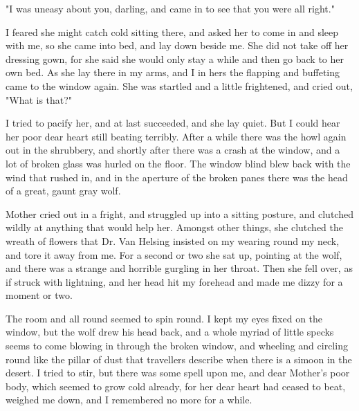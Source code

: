 "I was uneasy about you, darling, and came in to see that you were all right." 

I feared she might catch cold sitting there, and asked her to come in and sleep with me, so she came into bed, and lay down beside me. She did not take off her dressing gown, for she said she would only stay a while and then go back to her own bed. As she lay there in my arms, and I in hers the flapping and buffeting came to the window again. She was startled and a little frightened, and cried out, "What is that?" 

I tried to pacify her, and at last succeeded, and she lay quiet. But I could hear her poor dear heart still beating terribly. After a while there was the howl again out in the shrubbery, and shortly after there was a crash at the window, and a lot of broken glass was hurled on the floor. The window blind blew back with the wind that rushed in, and in the aperture of the broken panes there was the head of a great, gaunt gray wolf. 

Mother cried out in a fright, and struggled up into a sitting posture, and clutched wildly at anything that would help her. Amongst other things, she clutched the wreath of flowers that Dr. Van Helsing insisted on my wearing round my neck, and tore it away from me. For a second or two she sat up, pointing at the wolf, and there was a strange and horrible gurgling in her throat. Then she fell over, as if struck with lightning, and her head hit my forehead and made me dizzy for a moment or two. 

The room and all round seemed to spin round. I kept my eyes fixed on the window, but the wolf drew his head back, and a whole myriad of little specks seems to come blowing in through the broken window, and wheeling and circling round like the pillar of dust that travellers describe when there is a simoon in the desert. I tried to stir, but there was some spell upon me, and dear Mother's poor body, which seemed to grow cold already, for her dear heart had ceased to beat, weighed me down, and I remembered no more for a while. 

